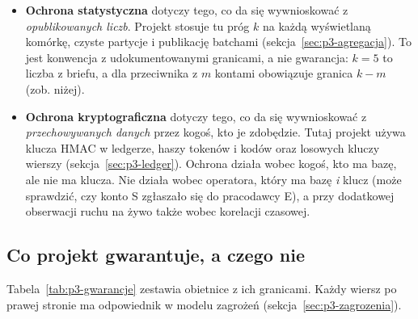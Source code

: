 \begin{itemize}[leftmargin=*]
    \item \textbf{Ochrona statystyczna} dotyczy tego, co da się wywnioskować
    z \emph{opublikowanych liczb}. Projekt stosuje tu próg $k$ na każdą
    wyświetlaną komórkę, czyste partycje i publikację batchami
    (sekcja~\ref{sec:p3-agregacja}). To jest konwencja z udokumentowanymi
    granicami, a nie gwarancja: $k=5$ to liczba z briefu, a dla przeciwnika z
    $m$ kontami obowiązuje granica $k-m$ (zob. niżej).
    \item \textbf{Ochrona kryptograficzna} dotyczy tego, co da się wywnioskować
    z \emph{przechowywanych danych} przez kogoś, kto je zdobędzie. Tutaj
    projekt używa klucza HMAC w ledgerze, haszy tokenów i kodów oraz
    losowych kluczy wierszy (sekcja~\ref{sec:p3-ledger}). Ochrona działa
    wobec kogoś, kto ma bazę, ale nie ma klucza. Nie działa wobec operatora,
    który ma bazę \emph{i} klucz (może sprawdzić, czy konto S zgłaszało się
    do pracodawcy E), a przy dodatkowej obserwacji ruchu na żywo także wobec
    korelacji czasowej.
\end{itemize}


\subsection{Co projekt gwarantuje, a czego nie}

Tabela~\ref{tab:p3-gwarancje} zestawia obietnice z ich granicami. Każdy
wiersz po prawej stronie ma odpowiednik w modelu zagrożeń (sekcja~\ref{sec:p3-zagrozenia}).

